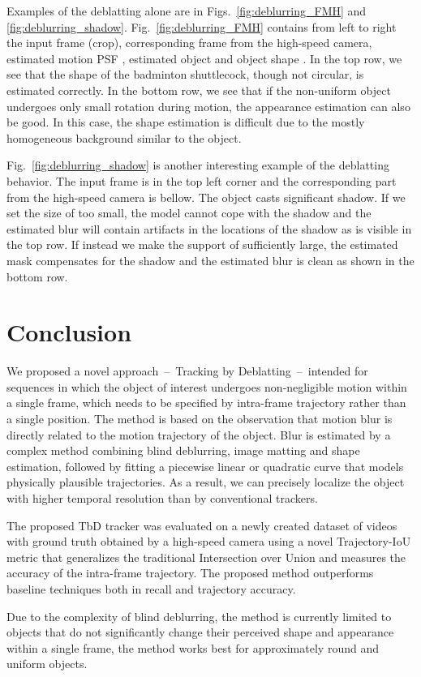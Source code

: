 \documentclass[10pt,twocolumn,letterpaper]{article}
\begin{document}
Examples of the deblatting alone are in Figs.~\ref{fig:deblurring_FMH} and \ref{fig:deblurring_shadow}. Fig.~\ref{fig:deblurring_FMH} contains from left to right the input frame (crop), corresponding frame from the high-speed camera, estimated motion PSF , estimated object  and object shape . In the top row, we see that the shape of the badminton shuttlecock, though not circular, is estimated correctly. In the bottom row, we see that if the non-uniform object undergoes only small rotation during motion, the appearance estimation can also be good. In this case, the shape estimation is difficult due to the mostly homogeneous background similar to the object.

Fig.~\ref{fig:deblurring_shadow} is another interesting example of the deblatting behavior. The input frame is in the top left corner and the corresponding part from the high-speed camera is bellow. The object casts significant shadow. If we set the size of  too small, the model cannot cope with the shadow and the estimated blur will contain artifacts in the locations of the shadow as is visible in the top row. If instead we make the support of  sufficiently large, the estimated mask compensates for the shadow and the estimated blur is clean as shown in the bottom row.
 \section{Conclusion}
\label{sec:conclusion}
We proposed a novel approach~--~Tracking by Deblatting~--~intended for sequences in which the object of interest undergoes non-negligible motion within a single frame, which needs to be specified by intra-frame trajectory rather than a single position.
The method is based on the observation that motion blur is directly related to the motion trajectory of the object. Blur is estimated by a complex method combining blind deblurring, image matting and shape estimation, 
followed by fitting a piecewise linear or quadratic curve that models physically plausible trajectories. As a result, we can precisely localize the object with higher temporal resolution than by conventional trackers. 

The proposed TbD tracker was evaluated on a newly created dataset of videos with ground truth obtained by a high-speed camera using a novel Trajectory-IoU metric that generalizes the traditional Intersection over Union and measures the accuracy of the intra-frame trajectory. The proposed method outperforms baseline techniques both in recall and trajectory accuracy. 

Due to the complexity of blind deblurring, the method is currently limited to objects that do not significantly change their perceived shape and appearance within a single frame, the method works best for approximately round and uniform objects.
 

{\small


}
\end{document}
